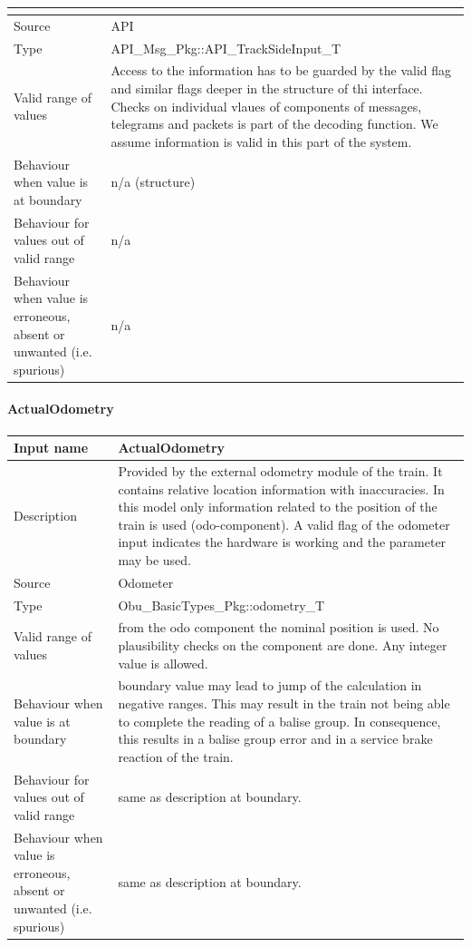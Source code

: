 \begin{longtable}{p{}p{}}
\begin{description}
\begin{description}
\begin{description}
\end{description}
\end{description}

\end{description}


\\
\midrule
Source					& API \\ 
\midrule
Type					& API\_Msg\_Pkg::API\_TrackSideInput\_T \\
\midrule
Valid range of values	& Access to the information has to be guarded by the valid flag and similar flags deeper in the structure of thi interface. Checks on individual vlaues of components of messages, telegrams and packets is part of the decoding function. We assume information is valid in this part of the system.\\
\midrule
Behaviour when value is at boundary	& n/a (structure)\\
\midrule
Behaviour for values out of valid range	& n/a\\
\midrule
Behaviour when value is erroneous, absent or unwanted (i.e. spurious) &n/a\\
\bottomrule
\end{longtable}


\paragraph{ActualOdometry}

\begin{longtable}{p{}p{}}
\toprule
Input name				& ActualOdometry \\
\midrule
Description				& Provided by the external odometry module of the train. It contains relative location information with inaccuracies. In this model only information related to the position of the train is used (odo-component). A valid flag of the odometer input indicates the hardware is working and the parameter may be used.\\
\midrule
Source					& Odometer \\ 
\midrule
Type					& Obu\_BasicTypes\_Pkg::odometry\_T \\
\midrule
Valid range of values	& from the odo component the nominal position is used. No plausibility checks on the component are done. Any integer value is allowed. \\
\midrule
Behaviour when value is at boundary	& boundary value may lead to jump of the calculation in negative ranges. This may result in the train not being able to complete the reading of a balise group. In consequence, this results in a balise group error and in a service brake reaction of the train.\\
\midrule
Behaviour for values out of valid range	& same as description at boundary.\\
\midrule
Behaviour when value is erroneous, absent or unwanted (i.e. spurious) & same as description at boundary.\\

\bottomrule
\end{longtable}

